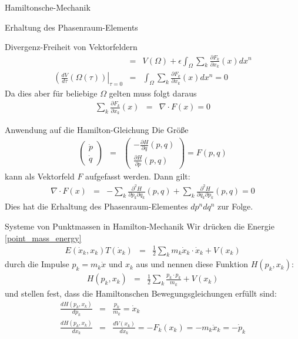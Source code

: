 \begin{chapter}{\titlestr}
\begin{section}{Hamiltonsche-Mechanik}
\begin{subsection}{Erhaltung des Phasenraum-Elements}
\begin{subsubsection}{Divergenz-Freiheit von Vektorfeldern}
\begin{eqnarray*}
&=& V(\Omega)+ \epsilon\int_{\Omega}\sum_k\frac{\partial F_k}{\partial x_k}(x) dx^n\\
\left(\frac{d V}{d\tau}(\Omega(\tau))\right|_{\tau=0} &=& \int_{\Omega}\sum_k\frac{\partial F_k}{\partial x_k}(x) dx^n = 0
\end{eqnarray*}
Da dies aber für beliebige $\Omega$ gelten muss folgt daraus
\begin{eqnarray*}
\sum_k\frac{\partial F_k}{\partial x_k}(x) &=& \nabla\cdot F(x) = 0
\end{eqnarray*}
\end{subsubsection}

\begin{subsubsection}{Anwendung auf die Hamilton-Gleichung}
Die Größe
\begin{eqnarray*}
\begin{pmatrix}
\dot{p}\\
\dot{q}
\end{pmatrix}
&=&
\begin{pmatrix}
-\frac{\partial H}{\partial q}(p,q)\\
\frac{\partial H}{\partial p}(p,q)
\end{pmatrix} = F(p,q)
\end{eqnarray*}
kann als Vektorfeld $F$ aufgefasst werden. Dann gilt:
\begin{eqnarray*}
\nabla\cdot F(x) &=& -\sum_k\frac{\partial^2 H}{\partial p_k\partial q_k}(p,q)+\sum_k\frac{\partial^2 H}{\partial q_k\partial p_k}(p,q)=0
\end{eqnarray*}
Dies hat die Erhaltung des Phasenraum-Elementes $dp^ndq^n$ zur Folge.
\end{subsubsection}
\end{subsection}

\begin{subsection}{Systeme von Punktmassen in Hamilton-Mechanik}
Wir drücken die Energie \ref{point_mass_energy}
\begin{eqnarray*}
E(\dot{x}_k,x_k)T(\dot{x}_k) &=& \frac{1}{2}\sum_km_k\dot{x}_k\cdot \dot{x}_k+V(x_k)
\end{eqnarray*}
durch die Impulse $p_k=m_k\dot{x}$ und $x_k$ aus und nennen diese Funktion $H(p_k,x_k)$:
\begin{eqnarray*}
H(p_k,x_k) &=& \frac{1}{2}\sum_k\frac{p_k\cdot p_k}{m_k}+V(x_k)
\end{eqnarray*}
und stellen fest, dass die Hamiltonschen Bewegungsgleichungen erfüllt sind:
\begin{eqnarray*}
\frac{dH(p_k,x_k)}{dp_k} &=& \frac{p_k}{m_k} =  \dot{x}_k\\
\frac{dH(p_k,x_k)}{dx_k} &=& \frac{dV(x_k)}{dx_k} = -F_k(x_k) = -m_k\ddot{x}_k = -\dot{p}_k
\end{eqnarray*}
\end{subsection}
\end{section}
\ifx\makebook\undefined
\begin{appendix}
\fi


\end{appendix}
\end{chapter}
